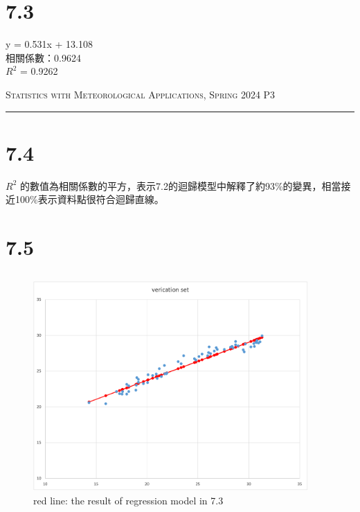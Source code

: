\documentclass{article}
\begin{document}
\begin{CJK*}{UTF8}{bsmi}
\section*{7.3}
\begin{spacing}{2.5}
    \begin{large}
        \begin{center}
            y = 0.531x + 13.108 \\
            相關係數：0.9624 \\
            $R^2$ = 0.9262
        \end{center}
    \end{large}
\end{spacing}

\newpage
\thispagestyle{empty}
\hfill {\scshape \large Statistics with Meteorological Applications, Spring 2024} \hfill {\scshape P3}
\smallskip
\hrule
\bigskip
\bigskip
\bigskip

\section*{7.4}
\begin{spacing}{2.5}
    \begin{large}
            $R^2$ 的數值為相關係數的平方，表示7.2的迴歸模型中解釋了約93\%的變異，相當接近100\%表示資料點很符合迴歸直線。
    \end{large}
\end{spacing}

\section*{7.5}
\begin{spacing}{2.5}
    \begin{large}
        \subsection*{}
        \begin{figure}[htbp]
            \centering
            \begin{minipage}[t]{0.7\textwidth}
                \centering
                \includegraphics[width=10.5cm]{Picture4.png}
                \caption{red line: the result of regression model in 7.3}
                \end{minipage}
        \end{figure}


\end{large}
\end{spacing}
\end{CJK*}
\end{document}
